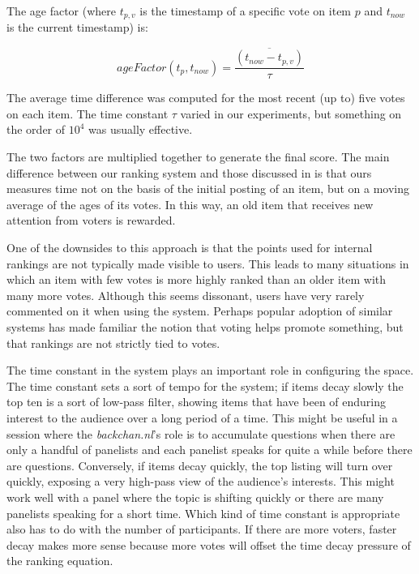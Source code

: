 The age factor (where $t_{p,v}$ is the timestamp of a specific vote on item $p$ and $t_{now}$ is the current timestamp) is:

\begin{equation}
ageFactor(t_p, t_{now}) = \frac{\overline{(t_{now} - t_{p,v})}}{\tau}
\end{equation}

The average time difference was computed for the most recent (up to) five votes on each item. The time constant $\tau$ varied in our experiments, but something on the order of $10^4$ was usually effective.

The two factors are multiplied together to generate the final score.
The main difference between our ranking system and those discussed in \citep{Anonymous:8tu} is that ours measures time not on the basis of the initial posting of an item, but on a moving average of the ages of its votes. In this way, an old item that receives new attention from voters is rewarded.

One of the downsides to this approach is that the points used for internal rankings are not typically made visible to users. This leads to many situations in which an item with few votes is more highly ranked than an older item with many more votes. Although this seems dissonant, users have very rarely commented on it when using the system. Perhaps popular adoption of similar systems has made familiar the notion that voting helps promote something, but that rankings are not strictly tied to votes.

The time constant in the system plays an important role in configuring the space. The time constant sets a sort of tempo for the system; if items decay slowly the top ten is a sort of low-pass filter, showing items that have been of enduring interest to the audience over a long period of a time. This might be useful in a session where the \emph{backchan.nl}'s role is to accumulate questions when there are only a handful of panelists and each panelist speaks for quite a while before there are questions. Conversely, if items decay quickly, the top listing will turn over quickly, exposing a very high-pass view of the audience's interests. This might work well with a panel where the topic is shifting quickly or there are many panelists speaking for a short time. Which kind of time constant is appropriate also has to do with the number of participants. If there are more voters, faster decay makes more sense because more votes will offset the time decay pressure of the ranking equation.


